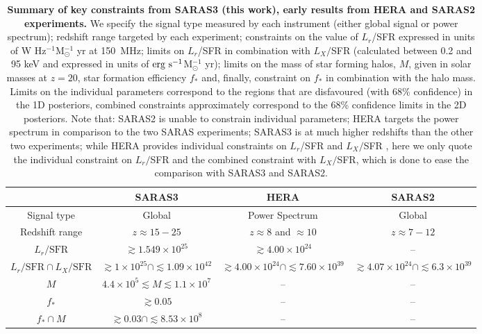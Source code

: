 \begin{landscape}
\bgroup
\def\arraystretch{1.5}
\begin{table}[ht!]
    \centering
    \begin{tabular}{|c|c|c|c|}
         \hline
         & SARAS3 & HERA & SARAS2 \\
         \hline
         \hline
         Signal type & Global & Power Spectrum & Global \\
         \hline
         Redshift range & $z\approx 15 - 25$ & $z\approx 8$ and $\approx 10$ & $z\approx 7 - 12$\\
         \hline
         \hline
         $L_{r}/\mathrm{SFR}$ & $\gtrsim 1.549\times10^{25}$ & $\gtrsim4.00\times10^{24}$ & -- \\
         \hline
         $L_{r}/\mathrm{SFR} \cap L_{X}/\mathrm{SFR}$ & $\gtrsim 1\times10^{25} \cap \lesssim 1.09\times10^{42}$ & $\gtrsim 4.00\times10^{24} \cap \lesssim 7.60\times10^{39}$ & $\gtrsim 4.07\times10^{24} \cap \lesssim 6.3\times10^{39}$\\
         \hline
         $M$ & $4.4\times10^{5} \lesssim M \lesssim 1.1\times10^{7}$ & -- & --\\
         \hline
         $f_*$ & $\gtrsim 0.05$ & -- & --\\
         \hline
         $f_* \cap M$ & $\gtrsim 0.03 \cap \lesssim 8.53\times10^{8}$ & -- & --\\
         \hline
    \end{tabular}
    \caption{\textbf{Summary of key constraints from SARAS3 (this work), early results from HERA \cite{HERA_2022b} and SARAS2 \cite{Bevins_SARAS2_2022} experiments.} We specify the signal type measured by each instrument (either  global signal or power spectrum); redshift range targeted by each experiment; constraints on the value of $L_r$/SFR expressed in units of  W Hz$^{-1}$M$_\odot^{-1}$ yr at 150~MHz; limits on $L_r$/SFR in combination with $L_X/$SFR (calculated between 0.2 and 95 keV and  expressed in units of  $\textnormal{erg~s}^{-1}$M$_\odot^{-1}$ yr); limits on  the mass of star forming halos,  $M$, given in solar masses at $z=20$, star formation efficiency $f_*$ and, finally, constraint on $f_*$ in combination with the halo mass. Limits on the individual parameters correspond to the regions that are disfavoured (with 68\% confidence) in the 1D posteriors, combined constraints approximately correspond to the 68\% confidence limits in the 2D posteriors. Note that: SARAS2 is unable to constrain individual parameters;  HERA targets the power spectrum in comparison to the two SARAS experiments; SARAS3 is at much higher redshifts than the other two experiments; while HERA provides individual constraints on  $L_r$/SFR and $L_X/$SFR \cite{HERA_2022b}, here we only quote the  individual constraint on $L_r/$SFR and the combined constraint with $L_X/$SFR, which is done to ease the comparison with SARAS3 and SARAS2.}
    \label{tab:numbers}
\end{table}
\egroup
\end{landscape}

